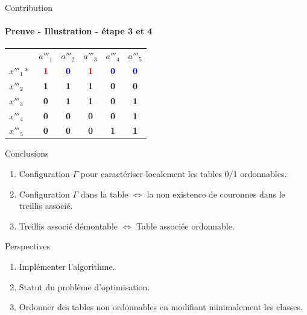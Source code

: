 \documentclass{beamer}
\begin{document}
 \begin{frame}{Contribution}
  \framesubtitle{Preuve - Illustration - étape 3 et 4}
\begin{table}[htb]
  \centering
\begin{tabular}{lccccc}
 & $a'''_1$ & $a'''_2$ & $a'''_3$ & $a'''_4$ & $a'''_5$\\
$x'''_1*$ & \textcolor{red}{\textbf{1}} & \textcolor{blue}{\textbf{0}} & \textcolor{red}{\textbf{1}} & \textcolor{blue}{\textbf{0}} & \textcolor{blue}{\textbf{0}}\\
$x'''_2$ & \textbf{1} & \textbf{1} & \textbf{1} & \textbf{0} & \textbf{0}\\
$x'''_3$ & \textbf{0} & \textbf{1} & \textbf{1} & \textbf{0} & \textbf{1}\\
$x'''_4$ & \textbf{0} & \textbf{0} & \textbf{0} & \textbf{0} & \textbf{1}\\
$x'''_5$ & \textbf{0} & \textbf{0} & \textbf{0} & \textbf{1} & \textbf{1}

\end{tabular}
\end{table}
  \end{frame}

  \begin{frame}{Conclusions}
  \begin{enumerate}
  \item Configuration $\Gamma$ pour caractériser localement les tables 0/1 ordonnables. 
  \item Configuration $\Gamma$ dans la table $\Leftrightarrow$ la non existence de couronnes dans le treillis associé.
  \item Treillis associé démontable $\Leftrightarrow$ Table associée ordonnable.
  \end{enumerate}
  \end{frame}
  \begin{frame}{Perspectives}
  \begin{enumerate}
  \item Implémenter l'algorithme.
  \item Statut du problème d'optimisation.
  \item Ordonner des tables non ordonnables en modifiant minimalement les classes.
  \end{enumerate}
  \end{frame}
\end{document}
